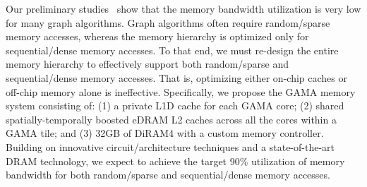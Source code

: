 



\noindent
Our preliminary studies~\cite{Xu2014, luo2010effective, kim2015compiler, kim2015locality} show that the memory bandwidth utilization is very low for many graph algorithms.
Graph algorithms often require random/sparse memory accesses, whereas the memory hierarchy is optimized only for sequential/dense memory accesses.
To that end, we must re-design the entire memory hierarchy to effectively support both random/sparse and sequential/dense memory accesses.
That is, optimizing either on-chip caches or off-chip memory alone is ineffective.
Specifically, we propose the GAMA memory system consisting of: 
(1) a private L1D cache for each GAMA core; 
(2) shared spatially-temporally boosted eDRAM L2 caches across all the cores within a GAMA tile; and 
(3) 32GB of DiRAM4 with a custom memory controller. 
Building on innovative circuit/architecture techniques and a state-of-the-art DRAM technology, 
we expect to achieve the target 90\% utilization of memory bandwidth for both random/sparse and sequential/dense memory accesses.


